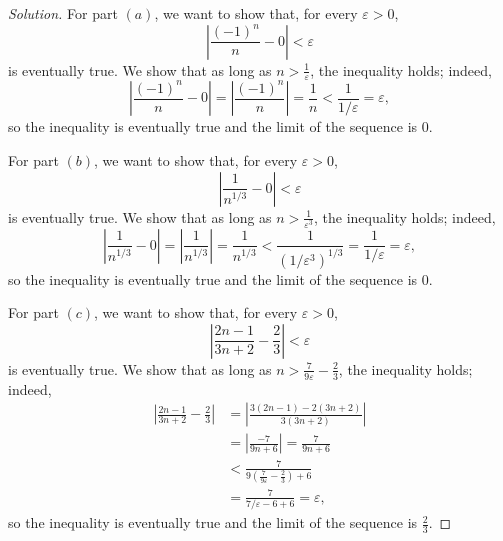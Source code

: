 \documentclass[11pt]{scrartcl}
\providecommand{\eps}{\varepsilon}
\theoremstyle{remark}
\newenvironment{soln}{\begin{proof}[Solution]}{\end{proof}}
\providecommand{\abs}[1]{\left|#1\right|}
\begin{document}
	\begin{soln}
		For part $(a)$, we want to show that, for every $\eps > 0$,
		\[\abs{\frac{(-1)^n}{n} - 0} < \eps\]
		is eventually true. We show that as long as $n > \frac1\eps$,
		the inequality holds; indeed,
		\[\abs{\frac{(-1)^n}{n} - 0} = \abs{\frac{(-1)^n}{n}} = \frac 1n
		< \frac{1}{1/\eps} = \eps,\]
		so the inequality is eventually true and the limit of the sequence is $0$.
		
		For part $(b)$, we want to show that, for every $\eps > 0$,
		\[\abs{\frac{1}{n^{1/3}} - 0} < \eps\]
		is eventually true. We show that as long as $n > \frac1{\eps^3}$,
		the inequality holds; indeed,
		\[\abs{\frac{1}{n^{1/3}} - 0} = \abs{\frac{1}{n^{1/3}}} = \frac 1{n^{1/3}}
		< \frac{1}{(1/\eps^3)^{1/3}} = \frac{1}{1/\eps} = \eps,\]
		so the inequality is eventually true and the limit of the sequence is $0$.
		
		For part $(c)$, we want to show that, for every $\eps > 0$,
		\[\abs{\frac{2n-1}{3n+2} - \frac23} < \eps\]
		is eventually true. We show that as long as $n > \frac{7}{9\eps} - \frac23$,
		the inequality holds; indeed,
		\begin{align*}
			\abs{\frac{2n-1}{3n+2} - \frac23} &=
			\abs{\frac{3(2n - 1) - 2(3n + 2)}{3(3n + 2)}}\\ &=
			\abs{\frac{-7}{9n + 6}} = \frac{7}{9n + 6}\\ &<
			\frac{7}{9\left(\frac{7}{9\eps} - \frac23\right) + 6}\\
			&= \frac{7}{7/\eps - 6 + 6} = \eps,
		\end{align*}
		so the inequality is eventually true and the limit of the sequence is
		$\frac23$.
	\end{soln}
	
\end{document}

